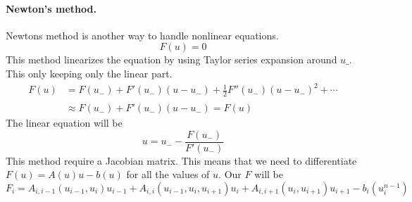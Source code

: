 \documentclass{book}
\begin{document}
\paragraph{Newton's method.}
Newtons method is another way to handle nonlinear equations. 
\begin{equation}
	F(u) = 0
\end{equation}
This method linearizes the equation by using Taylor series expansion around
$u\_$. This only keeping only the linear part.
\begin{align*}
	F(u) &= F(u_{-}) + F'(u_{-})(u - u_{-}) + \frac{1}{2}F''(u_{-})(u-u_{-})^2
	+\cdots  \\
	& \approx F(u_{-}) + F'(u_{-})(u - u_{-}) = \hat F(u)
\end{align*}
The linear equation will be
\begin{equation}
	u = u_{-} - \frac{F(u_{-})}{F'(u_{-})}
\end{equation}
This method require a Jacobian matrix. This means that we need to differentiate $F(u) = A(u)u - b(u)$ for all the 
values of $u$. Our $F$ will be
\begin{equation*}
F_i = A_{i,i-1}(u_{i-1},u_i)u_{i-1}+A_{i,i}(u_{i-1},u_{i},u_{i+1})u_{i}+A_{i,i+1}(u_i,u_{i+1})u_{i+1}-b_i(u^{n-1}_i)
\end{equation*}
\end{document}
